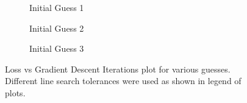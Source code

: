 \documentclass{article}
\begin{document}
    \begin{figure}[H]
        \centering
        \begin{subfigure}{.6\textwidth}
            \centering
            
            \caption{Initial Guess 1}
            \label{fig:Q3_loss_vs_steps_1}
        \end{subfigure}
        \begin{subfigure}{.6\textwidth}
            \centering
            
            \caption{Initial Guess 2}
            \label{fig:Q3_loss_vs_steps_2}
        \end{subfigure}
        \begin{subfigure}{.6\textwidth}
            \centering
            
            \caption{Initial Guess 3}
            \label{fig:Q3_loss_vs_steps_3}
        \end{subfigure}
        \caption{Loss vs Gradient Descent Iterations plot for various guesses. Different line search tolerances were used as shown in legend of plots.}
        \label{fig:Q3_loss_vs_steps_all}
    \end{figure}
\end{document}
